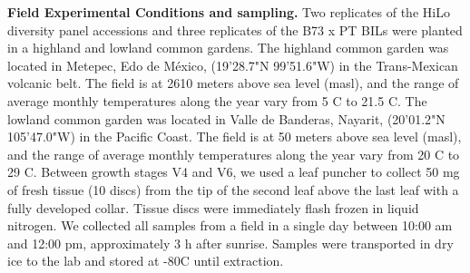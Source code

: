 \documentclass[9pt,twocolumn,twoside,lineno]{BioRxiv}
\begin{document}
\textbf{Field Experimental Conditions and sampling.} 
Two replicates of the HiLo diversity panel accessions and three replicates of the B73 x PT BILs were planted in a highland and lowland common gardens. 
The highland common garden was located in Metepec, Edo de México, (19'28.7"N 99'51.6"W) in the Trans-Mexican volcanic belt. 
The field is at 2610 meters above sea level (masl), and the range of average monthly temperatures along the year vary from 5 \degree C to 21.5 \degree C.  
The lowland common garden was located in Valle de Banderas, Nayarit, (20'01.2"N 105'47.0"W) in the Pacific Coast. 
The field is at 50 meters above sea level (masl), and the range of average monthly temperatures along the year vary from 20 \degree C to 29 \degree C.
Between growth stages V4 and V6, we used a leaf puncher to collect 50 mg of fresh tissue (10 discs) from the tip of the second leaf above the last leaf with a fully developed collar. 
Tissue discs were immediately flash frozen in liquid nitrogen. 
We collected all samples from a field in a single day between 10:00 am and 12:00 pm, approximately 3 h after sunrise. Samples were transported in dry ice to the lab and stored at -80\degree C until extraction. 
\end{document}
